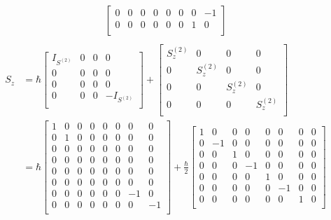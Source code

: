 \begin{example}
\begin{equation}
\begin{split}
\begin{bmatrix}
				0 & 0 & 0 & 0 & 0 & 0 & 0 & -1 \\
				0 & 0 & 0 & 0 & 0 & 0 & 1 & 0 \\
			\end{bmatrix} \\
		\end{split}
	\end{equation} 
	\begin{equation}
		\begin{split}
			S_z&=\hbar\begin{bmatrix}
				I_{S^{(2)}} & 0 & 0 & 0 \\
				0 & 0 & 0 & 0 \\
				0 & 0 & 0 & 0 \\
				0 & 0 & 0 & -I_{S^{(2)}} \\
			\end{bmatrix}+\begin{bmatrix}
				S^{(2)}_z & 0 & 0 & 0 \\
				0 & S^{(2)}_z & 0 & 0 \\
				0 & 0 & S^{(2)}_z & 0 \\
				0 & 0 & 0 & S^{(2)}_z \\
			\end{bmatrix} \\
			&=\hbar\begin{bmatrix}
				1 & 0 & 0 & 0 & 0 & 0 & 0 & 0 \\
				0 & 1 & 0 & 0 & 0 & 0 & 0 & 0 \\
				0 & 0 & 0 & 0 & 0 & 0 & 0 & 0 \\
				0 & 0 & 0 & 0 & 0 & 0 & 0 & 0 \\
				0 & 0 & 0 & 0 & 0 & 0 & 0 & 0 \\
				0 & 0 & 0 & 0 & 0 & 0 & 0 & 0 \\
				0 & 0 & 0 & 0 & 0 & 0 & -1 & 0 \\
				0 & 0 & 0 & 0 & 0 & 0 & 0 & -1 \\
			\end{bmatrix} +\frac{\hbar}{2}\begin{bmatrix}
				1 & 0 & 0 & 0 & 0 & 0 & 0 & 0 \\
				0 & -1 & 0 & 0 & 0 & 0 & 0 & 0 \\
				0 & 0 & 1 & 0 & 0 & 0 & 0 & 0 \\
				0 & 0 & 0 & -1 & 0 & 0 & 0 & 0 \\
				0 & 0 & 0 & 0 & 1 & 0 & 0 & 0 \\
				0 & 0 & 0 & 0 & 0 & -1 & 0 & 0 \\
				0 & 0 & 0 & 0 & 0 & 0 & 1 & 0 \\

\end{bmatrix}
\end{split}
\end{equation}
\end{example}

